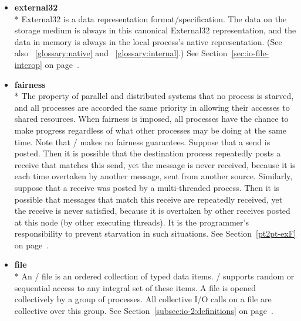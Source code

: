 \begin{itemize}
\label{glossary:external32}
\item \textbf{ external32} \\*
External32 is a data representation format/specification.
The data on the storage
medium is always in this canonical External32 representation, and
the data in memory
is always in the local process's native representation.
(See also ~\ref{glossary:native} and ~\ref{glossary:internal}.)
See Section~\ref{sec:io-file-interop} on page~\pageref{sec:io-file-interop}.

\label{glossary:fairness}
\item \textbf{ fairness} \\*
The property of parallel and distributed systems that no process is starved, 
and all processes are accorded the same priority in allowing their accesses 
to shared resources. When fairness is imposed, all processes have the 
chance to make progress regardless of what other processes may be 
doing at the same time. Note that \MPI/  makes no fairness guarantees.
Suppose that a send is posted.  Then it is possible
that the destination process repeatedly posts a receive that matches this
send, yet the message is never received, because it is each time overtaken by
another message, sent from another source.  Similarly, suppose that a
receive was posted by a multi-threaded process.  Then it is possible that
messages that
match this receive are repeatedly received, yet the receive is never satisfied,
because it is overtaken by other receives posted at this node (by
other executing threads).  It is the programmer's responsibility to prevent
starvation in such situations.
See Section~\ref{pt2pt-exF} on page~\pageref{pt2pt-exF}.

\label{glossary:file}
\item \textbf{ file} \\*
An \MPI/ file is an ordered collection of typed data items.
\MPI/ supports random or sequential access to any integral set of these items.
A file is opened collectively by a group of processes.
All collective I/O calls on a file are collective over this group.
See Section~\ref{subsec:io-2:definitions} on page~\pageref{subsec:io-2:definitions}.


\end{itemize}
